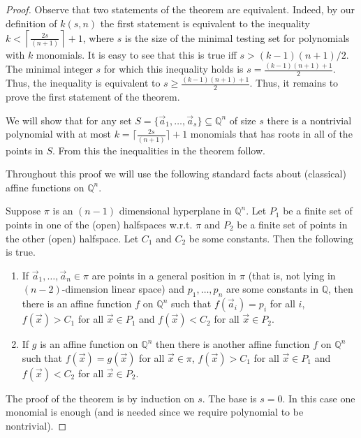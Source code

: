 \documentclass[11pt]{article}
\newcommand{\bb}[1]{\mathbb{#1}}
\begin{document}
\begin{proof}
Observe that two statements of the theorem are equivalent. Indeed, by our definition of $k(s,n)$ the first statement is equivalent to the inequality $k< \left\lceil \frac{2s}{(n+1)}\right\rceil + 1$, where $s$ is the size of the minimal testing set for polynomials with $k$ monomials. It is easy to see that this is true iff $s>(k-1)(n+1)/2$. The minimal integer $s$ for which this inequality holds is $s=\frac{(k-1)(n+1)+1}{2}$. Thus, the inequality is equivalent to $s\geq \frac{(k-1)(n+1)+1}{2}$. Thus, it remains to prove the first statement of the theorem.

We will show that for any set $S =  \{\vec{a}_1,\ldots, \vec{a}_s\}\subseteq \bb{Q}^n$ of size $s$ there is a nontrivial polynomial with at most $k= \lceil \frac{2s}{(n+1)}\rceil + 1$ monomials that has roots in all of the points in $S$. From this the inequalities in the theorem follow.

Throughout this proof we will use the following standard facts about (classical) affine functions on $\bb{Q}^n$.

\begin{claim} \label{cl:geometry}
Suppose $\pi$ is an $(n-1)$ dimensional hyperplane in $\bb{Q}^n$. Let $P_1$ be a finite set of points in one of the (open) halfspaces w.r.t. $\pi$ and $P_2$ be a finite set of points in the other (open) halfspace. Let $C_1$ and $C_2$ be some constants.
Then the following is true.
\begin{enumerate}
\item If $\vec{a}_1,\ldots, \vec{a}_n \in \pi$ are points in a general position in $\pi$ (that is, not lying in $(n-2)$-dimension linear space) and $p_1,\ldots, p_n$ are some constants in $\bb{Q}$, then there is an affine function $f$ on $\bb{Q}^n$ such that $f(\vec{a}_i)=p_i$ for all $i$, $f(\vec{x}) > C_1$ for all $\vec{x} \in P_1$ and $f(\vec{x})<C_2$ for all $\vec{x} \in P_2$.
\item If $g$ is an affine function on $\bb{Q}^n$ then there is another affine function $f$ on $\bb{Q}^n$ such that $f(\vec{x})=g(\vec{x})$ for all $\vec{x} \in \pi$, $f(\vec{x}) > C_1$ for all $\vec{x} \in P_1$ and $f(\vec{x})<C_2$ for all $\vec{x} \in P_2$.
\end{enumerate}
\end{claim}

The proof of the theorem is by induction on $s$. The base is $s=0$. In this case one monomial is enough (and is needed since we require polynomial to be nontrivial).


\end{proof}
\end{document}
